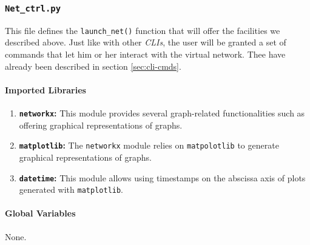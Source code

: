\subsubsection{\texttt{Net\_ctrl.py}}
    This file defines the \texttt{launch\_net()} function that will offer the facilities we described above. Just like with other \textit{CLIs}, the user will be granted a set of commands that let him or her interact with the virtual network. Thee have already been described in section \ref{sec:cli-cmds}.\\

    \paragraph{Imported Libraries}
        \begin{enumerate}
            \item \textbf{\texttt{networkx}:} This module provides several graph-related functionalities such as offering graphical representations of graphs.
            \item \textbf{\texttt{matplotlib}:} The \texttt{networkx} module relies on \texttt{matpolotlib} to generate graphical representations of graphs.
            \item \textbf{\texttt{datetime}:} This module allows using timestamps on the abscissa axis of plots generated with \texttt{matplotlib}.
        \end{enumerate}

    \paragraph{Global Variables}
        None.

